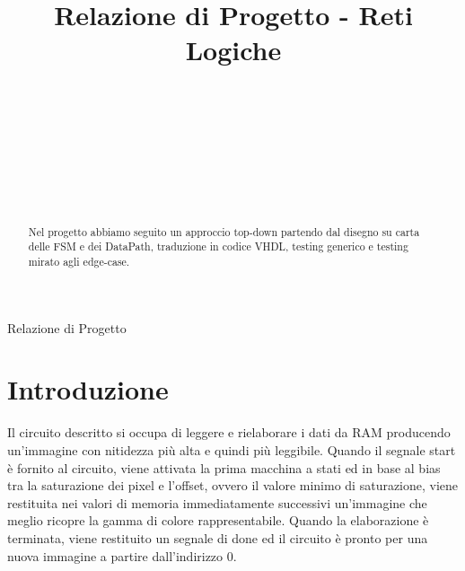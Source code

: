 \documentclass{article}
\begin{document}
\title{Relazione di Progetto - Reti Logiche%
%
}

\author{\\[2pt] 
\\
\\
\and
\\
\\
\\
}

%
%
{Relazione di Progetto} 

\maketitle

\begin{abstract}
Nel progetto abbiamo seguito un approccio top-down partendo dal disegno su carta delle FSM e dei DataPath, traduzione in codice VHDL, testing generico e testing mirato agli edge-case.
\end{abstract}


\section{Introduzione}
\label{intro}
Il circuito descritto si occupa di leggere e rielaborare i dati da RAM producendo un'immagine con nitidezza più alta e quindi più leggibile. 
Quando il segnale start è fornito al circuito, viene attivata la prima macchina a stati ed in base al bias tra la saturazione dei pixel e l'offset, ovvero il valore minimo di saturazione, viene restituita nei valori di memoria immediatamente successivi un'immagine che meglio ricopre la gamma di colore rappresentabile.
Quando la elaborazione è terminata, viene restituito un segnale di done ed il circuito è pronto per una nuova immagine a partire dall'indirizzo 0.
\end{document}
